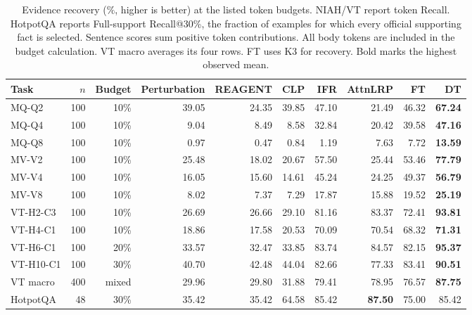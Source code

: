 \begin{table}[t]
\centering\footnotesize
\caption{Evidence recovery ($\%$, higher is better) at the listed token budgets. NIAH/VT report token Recall. HotpotQA reports Full-support Recall@30\%, the fraction of examples for which every official supporting fact is selected. Sentence scores sum positive token contributions. All body tokens are included in the budget calculation. VT macro averages its four rows. FT uses K3 for recovery. Bold marks the highest observed mean.}
\label{tab:recovery}
\setlength{\tabcolsep}{2.2pt}
\begin{tabular}{@{}lrr rrrrrrr@{}}
\toprule
Task & $n$ & Budget & Perturbation & REAGENT & CLP & IFR & AttnLRP & FT & DT \\
\midrule
MQ-Q2 & 100 & 10\% & 39.05 & 24.35 & 39.85 & 47.10 & 21.49 & 46.32 & \textbf{67.24} \\
MQ-Q4 & 100 & 10\% & 9.04 & 8.49 & 8.58 & 32.84 & 20.42 & 39.58 & \textbf{47.16} \\
MQ-Q8 & 100 & 10\% & 0.97 & 0.47 & 0.84 & 1.19 & 7.63 & 7.72 & \textbf{13.59} \\
MV-V2 & 100 & 10\% & 25.48 & 18.02 & 20.67 & 57.50 & 25.44 & 53.46 & \textbf{77.79} \\
MV-V4 & 100 & 10\% & 16.05 & 15.60 & 14.61 & 45.24 & 24.25 & 49.37 & \textbf{56.79} \\
MV-V8 & 100 & 10\% & 8.02 & 7.37 & 7.29 & 17.87 & 15.88 & 19.52 & \textbf{25.19} \\
\midrule
VT-H2-C3 & 100 & 10\% & 26.69 & 26.66 & 29.10 & 81.16 & 83.37 & 72.41 & \textbf{93.81} \\
VT-H4-C1 & 100 & 10\% & 18.86 & 17.58 & 20.53 & 70.09 & 70.54 & 68.32 & \textbf{71.31} \\
VT-H6-C1 & 100 & 20\% & 33.57 & 32.47 & 33.85 & 83.74 & 84.57 & 82.15 & \textbf{95.37} \\
VT-H10-C1 & 100 & 30\% & 40.70 & 42.48 & 44.04 & 82.66 & 77.33 & 83.41 & \textbf{90.51} \\
VT macro & 400 & mixed & 29.96 & 29.80 & 31.88 & 79.41 & 78.95 & 76.57 & \textbf{87.75} \\
\midrule
HotpotQA & 48 & 30\% & 35.42 & 35.42 & 64.58 & 85.42 & \textbf{87.50} & 75.00 & 85.42 \\
\bottomrule
\end{tabular}
\end{table}
